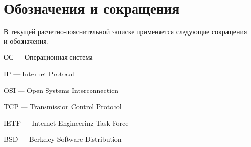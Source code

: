 \chapter*{Обозначения и сокращения}

В текущей расчетно-пояснительной записке применяется следующие сокращения и обозначения.

ОС --- Операционная система

IP ---  Internet Protocol 

OSI --- Open Systems Interconnection 

TCP --- Transmission Control Protocol

IETF --- Internet Engineering Task Force

BSD --- Berkeley Software Distribution

